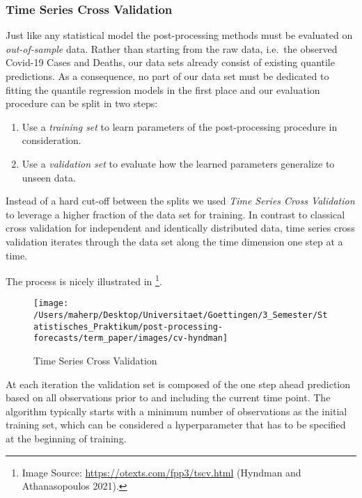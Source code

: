 \documentclass[
]{article}
\begin{document}
\hypertarget{time-series-cross-validation}{%
\subsubsection{Time Series Cross Validation}\label{time-series-cross-validation}}

Just like any statistical model the post-processing methods must be evaluated on \emph{out-of-sample} data.
Rather than starting from the raw data, i.e.~the observed Covid-19 Cases and Deaths, our data sets already consist of existing quantile predictions.
As a consequence, no part of our data set must be dedicated to fitting the quantile regression models in the first place and our evaluation procedure can be split in two steps:

\begin{enumerate}
\def\labelenumi{\arabic{enumi}.}
\item
  Use a \emph{training set} to learn parameters of the post-processing procedure in consideration.
\item
  Use a \emph{validation set} to evaluate how the learned parameters generalize to unseen data.
\end{enumerate}

Instead of a hard cut-off between the splits we used \emph{Time Series Cross Validation} to leverage a higher fraction of the data set for training.
In contrast to classical cross validation for independent and identically distributed data, time series cross validation iterates through the data set along the time dimension one step at a time.

The process is nicely illustrated in \footnote{Image Source: \url{https://otexts.com/fpp3/tscv.html} (Hyndman and Athanasopoulos 2021).}.

\begin{figure}

{\centering \texttt{[image: /Users/maherp/Desktop/Universitaet/Goettingen/3\_Semester/Statistisches\_Praktikum/post-processing-forecasts/term\_paper/images/cv-hyndman]} 

}

\caption{Time Series Cross Validation}\label{fig:ch1-cv}
\end{figure}

At each iteration the validation set is composed of the one step ahead prediction based on all observations prior to and including the current time point.
The algorithm typically starts with a minimum number of observations as the initial training set, which can be considered a hyperparameter that has to be specified at the beginning of training.
\end{document}
